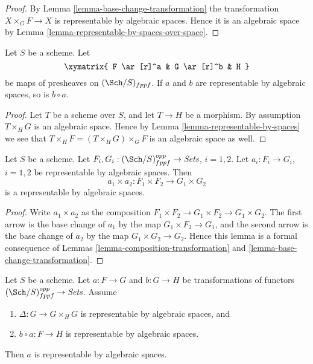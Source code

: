 \begin{proof}
By Lemma \ref{lemma-base-change-transformation} the transformation
$X \times_G F \to X$ is representable by algebraic spaces. Hence it is
an algebraic space by
Lemma \ref{lemma-representable-by-spaces-over-space}.
\end{proof}

\begin{lemma}
\label{lemma-composition-transformation}
Let $S$ be a scheme.
Let
$$
\xymatrix{
F \ar[r]^a & G \ar[r]^b & H
}
$$
be maps of presheaves on $(\Sch/S)_{fppf}$.
If $a$ and $b$ are representable by algebraic spaces, so is
$b \circ a$.
\end{lemma}

\begin{proof}
Let $T$ be a scheme over $S$, and let $T \to H$ be a morphism.
By assumption $T \times_H G$ is an algebraic space. Hence by
Lemma \ref{lemma-representable-by-spaces}
we see that $T \times_H F = (T \times_H G) \times_G F$ is an
algebraic space as well.
\end{proof}

\begin{lemma}
\label{lemma-product-transformations}
Let $S$ be a scheme.
Let $F_i, G_i : (\Sch/S)_{fppf}^{opp} \to \textit{Sets}$, $i = 1, 2$.
Let $a_i : F_i \to G_i$, $i = 1, 2$
be representable by algebraic spaces.
Then
$$
a_1 \times a_2 : F_1 \times F_2 \longrightarrow G_1 \times G_2
$$
is a representable by algebraic spaces.
\end{lemma}

\begin{proof}
Write $a_1 \times a_2$ as the composition
$F_1 \times F_2 \to G_1 \times F_2 \to G_1 \times G_2$.
The first arrow is the base change of $a_1$ by the map
$G_1 \times F_2 \to G_1$, and the second arrow
is the base change of $a_2$ by the map
$G_1 \times G_2 \to G_2$. Hence this lemma is a formal
consequence of Lemmas \ref{lemma-composition-transformation}
and \ref{lemma-base-change-transformation}.
\end{proof}

\begin{lemma}
\label{lemma-representable-by-spaces-permanence}
Let $S$ be a scheme. Let $a : F \to G$ and $b : G \to H$ be
transformations of functors $(\Sch/S)_{fppf}^{opp} \to \textit{Sets}$.
Assume
\begin{enumerate}
\item $\Delta : G \to G \times_H G$ is representable
by algebraic spaces, and
\item $b \circ a : F \to H$ is representable by algebraic spaces.
\end{enumerate}
Then $a$ is representable by algebraic spaces.
\end{lemma}

